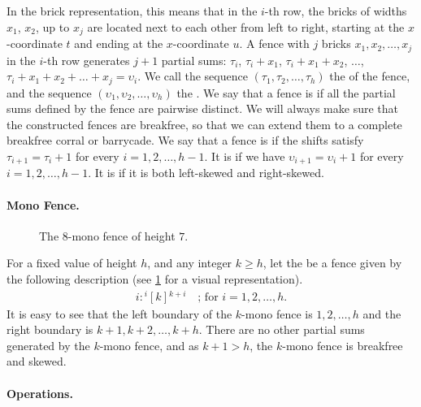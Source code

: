 \documentclass[runningheads,envcountsame]{llncs}
\let\ge\geqslant
\begin{document}
In the brick representation, this means that in the $i$-th row, the bricks of widths $x_1$, $x_2$, up to $x_j$ are located next to each other from left to right, starting at the $x$-coordinate $t$ and ending at the $x$-coordinate $u$.
A fence with $j$ bricks $x_1, x_2, \ldots, x_j$ in the $i$-th row generates $j+1$ partial sums: $\tau_i$, $\tau_i+x_1$, $\tau_i+x_1+x_2$, $\ldots$, $\tau_i+x_1+x_2+\ldots+x_j = \upsilon_i$.
We call the sequence $(\tau_1,\tau_2,\ldots,\tau_h)$ the  of the fence, and the sequence $(\upsilon_1,\upsilon_2,\ldots,\upsilon_h)$ the .
We say that a fence is  if all the partial sums defined by the fence are pairwise distinct.
We will always make sure that the constructed fences are breakfree, so that we can extend them to a complete breakfree corral or barrycade.
We say that a fence is  if the shifts satisfy
$\tau_{i+1} = \tau_i + 1$ for every $i=1,2,\ldots,h-1$.
It is  if we have $\upsilon_{i+1} = \upsilon_i + 1$ for every $i=1,2,\ldots,h-1$.
It is  if it is both left-skewed and right-skewed.

\paragraph{Mono Fence.}
\begin{figure}[ht]
    \centering
    \caption{The $8$-mono fence of height $7$.}
    \label{fig:mono_fence}
\end{figure}
For a fixed value of height $h$, and any integer $k \ge h$, let the  be a fence given by the following description (see \cref{fig:mono_fence} for a visual representation).
\begin{gather*}
    i:{}^i[k]{}^{k+i}\quad\text{; for } i=1,2,\ldots,h\text{.}
\end{gather*}
It is easy to see that the left boundary of the $k$-mono fence is $1,2,\ldots,h$ and the right boundary is $k+1,k+2,\ldots,k+h$.
There are no other partial sums generated by the $k$-mono fence, and as $k+1>h$, the $k$-mono fence is breakfree and skewed.

\paragraph{Operations.}
\end{document}
